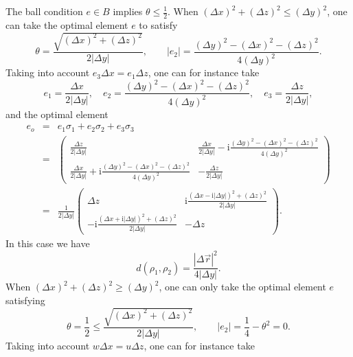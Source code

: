\documentclass[a4paper,11pt]{article}
\begin{document}
The ball condition $e \in B$ implies $\theta \leqslant \frac{1}{2}$.
When $(\Delta x)^2 + (\Delta z)^2 \leqslant (\Delta y)^2$, one can take the
optimal element $e$ to satisfy
\begin{equation}
  \theta = \frac{\sqrt{(\Delta x)^2 + (\Delta z)^2}}{2 | \Delta y|},
  \qquad |e_2 | = \frac{(\Delta y)^2 - (\Delta x)^2 - (\Delta z)^2}{4
  (\Delta y)^2} .
\end{equation}
Taking into account $e_3 \Delta x = e_1 \Delta z$, one can for instance take
\begin{equation}
  e_1 = \frac{\Delta x}{2 | \Delta y|}, \quad e_2 = \frac{(\Delta
  y)^2 - (\Delta x)^2 - (\Delta z)^2}{4  (\Delta y)^2}, \quad e_3 =
  \frac{\Delta z}{2 | \Delta y|},
\end{equation}
and the optimal element
\begin{eqnarray}
  e_o & = & e_1 \sigma_1 + e_2 \sigma_2 + e_3 \sigma_3 \nonumber\\
  & = & \left( \begin{array}{cc}
    \frac{\Delta z}{2 | \Delta y|} & \frac{\Delta x}{2 |
    \Delta y|} - \mathrm{i} \frac{(\Delta y)^2 - (\Delta x)^2 - (\Delta
    z)^2}{4 (\Delta y)^2}\\
    \frac{\Delta x}{2 | \Delta y|} + \mathrm{i} \frac{(\Delta y)^2 -
    (\Delta x)^2 - (\Delta z)^2}{4 (\Delta y)^2} & - \frac{\Delta
    z}{2 | \Delta y|}
  \end{array} \right) \nonumber\\
  & = & \frac{1}{2 | \Delta y|} \left( \begin{array}{cc}
    \Delta z & \mathrm{i} \frac{(\Delta x - \mathrm{i}| \Delta y|)^2 + (\Delta z)^2}{2|
    \Delta y|}\\
    - \mathrm{i} \frac{(\Delta x + \mathrm{i}| \Delta y|)^2 + (\Delta z)^2}{2| \Delta
    y|} & - \Delta z
  \end{array} \right) . 
\end{eqnarray}
In this case we have
\begin{equation}
  d (\rho_1, \rho_2) = \frac{| \Delta \vec{r} |^2}{4 | \Delta y|} .
\end{equation}
When $(\Delta x)^2 + (\Delta z)^2 \geqslant (\Delta y)^2$, one can only take the
optimal element $e$ satisfying
\begin{equation}
  \theta = \frac{1}{2} \leqslant \frac{\sqrt{(\Delta x)^2 + (\Delta z)^2}}{2
  | \Delta y|}, \qquad |e_2 | = \frac{1}{4 } - \theta^2 = 0.
\end{equation}
Taking into account $w \Delta x = u \Delta z$, one can for instance take
\end{document}
